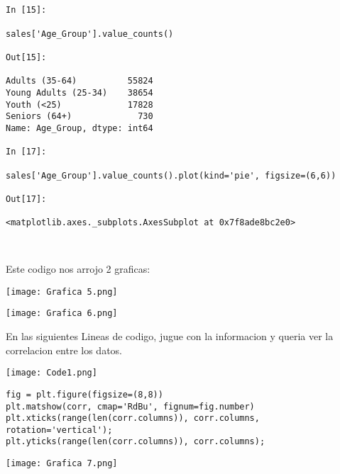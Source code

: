 \documentclass[
	12pt, %
]{fphw}
\begin{document}
\lstset{language=Python}
\lstset{frame=lines}
\lstset{basicstyle=\footnotesize}
\begin{lstlisting}


In [15]:

sales['Age_Group'].value_counts()

Out[15]:

Adults (35-64)          55824
Young Adults (25-34)    38654
Youth (<25)             17828
Seniors (64+)             730
Name: Age_Group, dtype: int64

In [17]:

sales['Age_Group'].value_counts().plot(kind='pie', figsize=(6,6))

Out[17]:

<matplotlib.axes._subplots.AxesSubplot at 0x7f8ade8bc2e0>



\end{lstlisting}

Este codigo nos arrojo 2 graficas:

\begin{center}
	\texttt{[image: Grafica 5.png]} %
\end{center}

\begin{center}
	\texttt{[image: Grafica 6.png]} %
\end{center}

En las siguientes Lineas de codigo, jugue con la informacion y queria ver la correlacion entre los datos.

\begin{center}
	\texttt{[image: Code1.png]} %
\end{center}


\lstset{language=Python}
\lstset{frame=lines}
\lstset{basicstyle=\footnotesize}
\begin{lstlisting}
fig = plt.figure(figsize=(8,8))
plt.matshow(corr, cmap='RdBu', fignum=fig.number)
plt.xticks(range(len(corr.columns)), corr.columns, rotation='vertical');
plt.yticks(range(len(corr.columns)), corr.columns);
\end{lstlisting}

\begin{center}
	\texttt{[image: Grafica 7.png]} %
\end{center}
\end{document}
